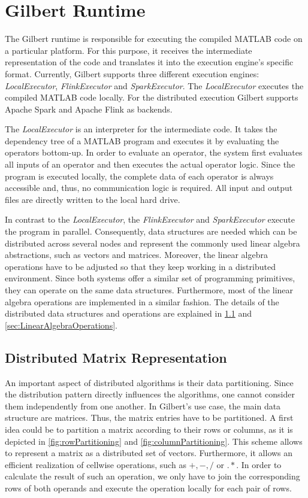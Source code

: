 \section{Gilbert Runtime}
\label{sec:gilbertRuntime}

The Gilbert runtime is responsible for executing the compiled MATLAB code on a particular platform. 
For this purpose, it receives the intermediate representation of the code and translates it into the execution engine's specific format. 
Currently, Gilbert supports three different execution engines: \emph{LocalExecutor}, \emph{FlinkExecutor} and \emph{SparkExecutor}. 
The \emph{LocalExecutor} executes the compiled MATLAB code locally. 
For the distributed execution Gilbert supports Apache Spark and Apache Flink as backends. 

The \emph{LocalExecutor} is an interpreter for the intermediate code.
It takes the dependency tree of a MATLAB program and executes it by evaluating the operators bottom-up. 
In order to evaluate an operator, the system first evaluates all inputs of an operator and then executes the actual operator logic. 
Since the program is executed locally, the complete data of each operator is always accessible and, thus, no communication logic is required. 
All input and output files are directly written to the local hard drive. 

In contrast to the \emph{LocalExecutor}, the \emph{FlinkExecutor} and \emph{SparkExecutor} execute the program in parallel. 
Consequently, data structures are needed which can be distributed across several nodes and represent the commonly used linear algebra abstractions, such as vectors and matrices. 
Moreover, the linear algebra operations have to be adjusted so that they keep working in a distributed environment. 
Since both systems offer a similar set of programming primitives, they can operate on the same data structures. 
Furthermore, most of the linear algebra operations are implemented in a similar fashion.
The details of the distributed data structures and operations are explained in \cref{sec:DistributedMatrixRepresentation} and \cref{sec:LinearAlgebraOperations}.

\subsection{Distributed Matrix Representation}
\label{sec:DistributedMatrixRepresentation}

An important aspect of distributed algorithms is their data partitioning. 
Since the distribution pattern directly influences the algorithms, one cannot consider them independently from one another. 
In Gilbert's use case, the main data structure are matrices. 
Thus, the matrix entries have to be partitioned.
A first idea could be to partition a matrix according to their rows or columns, as it is depicted in \cref{fig:rowPartitioning} and \cref{fig:columnPartitioning}. 
This scheme allows to represent a matrix as a distributed set of vectors.
Furthermore, it allows an efficient realization of cellwise operations, such as $+,-,/$ or $.*$. 
In order to calculate the result of such an operation, we only have to join the corresponding rows of both operands and execute the operation locally for each pair of rows.

